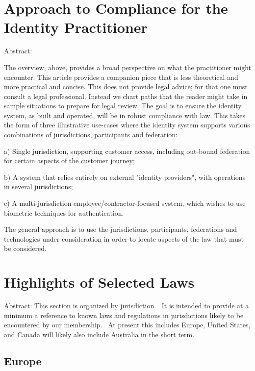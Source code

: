 \hypertarget{approach-to-compliance-for-the-identity-practitioner}{%
\section{Approach to Compliance for the Identity
Practitioner}\label{approach-to-compliance-for-the-identity-practitioner}}

Abstract:

The overview, above, provides a broad perspective on what the
practitioner might encounter. This article provides a companion piece
that is less theoretical and more practical and concise. This does not
provide legal advice; for that one must consult a legal professional.
Instead we chart paths that the reader might take in sample situations
to prepare for legal review. The goal is to ensure the identity system,
as built and operated, will be in robust compliance with law. This takes
the form of three illustrative use-cases where the identity system
supports various combinations of jurisdictions, participants and
federation:

a) Single jurisdiction, supporting customer access, including out-bound
federation for certain aspects of the customer journey;

b) A system that relies entirely on external "identity providers", with
operations in several jurisdictions;

c) A multi-jurisdiction employee/contractor-focused system, which wishes
to use biometric techniques for authentication.

The general approach is to use the jurisdictions, participants,
federations and technologies under consideration in order to locate
aspects of the law that must be considered.

\hypertarget{highlights-of-selected-laws}{%
\section{Highlights of Selected
Laws}\label{highlights-of-selected-laws}}

Abstract: This section is organized by jurisdiction.~ It is intended to
provide at a minimum a reference to known laws and regulations in
jurisdictions likely to be encountered by our membership.~ At present
this includes Europe, United States, and Canada will likely also include
Australia in the short term.

\hypertarget{europe}{%
\subsection{Europe}\label{europe}}

